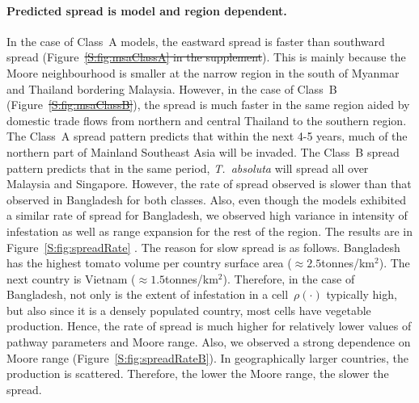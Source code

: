 \documentclass[11pt]{article}
\newcommand{\tuta}{\emph{T.~absoluta}}
\newcommand{\infest}{\rho}
\theoremstyle{definition}
\providecommand{\DIFaddtex}[1]{{\protect\color{blue}\uwave{#1}}} %
\providecommand{\DIFdeltex}[1]{{\protect\color{red}\sout{#1}}}                      %
\providecommand{\DIFaddbegin}{} %
\providecommand{\DIFaddend}{} %
\providecommand{\DIFdelbegin}{} %
\providecommand{\DIFdelend}{} %
\providecommand{\DIFadd}[1]{\texorpdfstring{\DIFaddtex{#1}}{#1}} %
\providecommand{\DIFdel}[1]{\texorpdfstring{\DIFdeltex{#1}}{}} %
\newcommand{\DIFscaledelfig}{0.5}
\newlength{\DIFdelgraphicswidth} %
\newlength{\DIFdelgraphicsheight} %
\newcommand{\DIFaddincludegraphics}[2][]{{\color{blue}\fbox{\DIFOincludegraphics[#1]{#2}}}} %
\newcommand{\DIFdelincludegraphics}[2][]{%
\sbox{\DIFdelgraphicsbox}{\DIFOincludegraphics[#1]{#2}}%
\settoboxwidth{\DIFdelgraphicswidth}{\DIFdelgraphicsbox} %
\settoboxtotalheight{\DIFdelgraphicsheight}{\DIFdelgraphicsbox} %
\scalebox{\DIFscaledelfig}{%
\parbox[b]{\DIFdelgraphicswidth}{\usebox{\DIFdelgraphicsbox}\\[-\baselineskip] \rule{\DIFdelgraphicswidth}{0em}}\llap{\resizebox{\DIFdelgraphicswidth}{\DIFdelgraphicsheight}{%
\setlength{\unitlength}{\DIFdelgraphicswidth}%
\begin{picture}(1,1)%
\thicklines\linethickness{2pt} %
{\color[rgb]{1,0,0}\put(0,0){\framebox(1,1){}}}%
{\color[rgb]{1,0,0}\put(0,0){\line( 1,1){1}}}%
{\color[rgb]{1,0,0}\put(0,1){\line(1,-1){1}}}%
\end{picture}%
}\hspace*{3pt}}} %
} %
\DeclareRobustCommand{\DIFaddbegin}{\DIFOaddbegin \let\includegraphics\DIFaddincludegraphics} %
\DeclareRobustCommand{\DIFaddend}{\DIFOaddend \let\includegraphics\DIFOincludegraphics} %
\DeclareRobustCommand{\DIFdelbegin}{\DIFOdelbegin \let\includegraphics\DIFdelincludegraphics} %
\DeclareRobustCommand{\DIFdelend}{\DIFOaddend \let\includegraphics\DIFOincludegraphics} %
\begin{document}
\paragraph{Predicted spread is model and region dependent.} In the case of
Class~A models, the eastward spread is faster than southward spread
(Figure~\DIFdelbegin \DIFdel{\ref{S:fig:msaClassA} in the supplement}\DIFdelend \DIFaddbegin \DIFadd{\ref{fig:msaClassA}}\DIFaddend ). This is mainly because the Moore
neighbourhood is smaller at the narrow region in the south of Myanmar and
Thailand bordering Malaysia.  However, in the case of Class~B
(Figure~\DIFdelbegin \DIFdel{\ref{S:fig:msaClassB}}\DIFdelend \DIFaddbegin \DIFadd{\ref{fig:msaClassB}}\DIFaddend ), the spread is much faster in the same region
aided by domestic trade flows from northern and central Thailand to the
southern region. The Class~A spread pattern predicts that within the next
4-5 years, much of the northern part of Mainland Southeast Asia will be
invaded.  The Class~B spread pattern predicts that in the same period,
\tuta{} will spread all over Malaysia and Singapore.  However, the rate of
spread observed is slower than that observed in Bangladesh for both
classes. Also, even though the models exhibited a similar rate of spread
for Bangladesh, we observed high variance in intensity of infestation as
well as range expansion for the rest of the region. The results are in
Figure~\ref{S:fig:spreadRate} \DIFaddbegin \DIFadd{in the supplement}\DIFaddend . The reason for slow spread
is as follows.  Bangladesh has the highest tomato volume per country
surface area ($\approx2.5$tonnes/km$^2$).  The next country is Vietnam
($\approx1.5$tonnes/km$^2$). Therefore, in the case of Bangladesh, not only
is the extent of infestation in a cell~$\infest(\cdot)$ typically high, but
also since it is a densely populated country, most cells have vegetable
production. Hence, the rate of spread is much higher for relatively lower
values of pathway parameters and Moore range. Also, we observed a strong
dependence on Moore range (Figure~\ref{S:fig:spreadRateB}).  In
geographically larger countries, the production is scattered. Therefore,
the lower the Moore range, the slower the spread.
\end{document}
